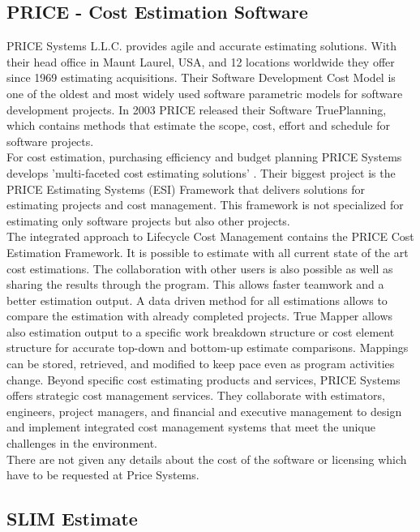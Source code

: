 \subsection{PRICE - Cost Estimation Software}

PRICE Systems L.L.C. provides agile and accurate estimating solutions. With their head office in Maunt Laurel, USA, and 12 locations worldwide they offer since 1969 estimating acquisitions. Their Software Development Cost Model is one of the oldest and most widely used software parametric models for software development projects. In 2003 PRICE released their Software TruePlanning, which contains methods that estimate the scope, cost, effort and schedule for software projects.
\\
For cost estimation, purchasing efficiency and budget planning PRICE Systems develops 'multi-faceted cost estimating solutions' \cite{pricesystems}. Their biggest project is the PRICE Estimating Systems (ESI) Framework that delivers solutions for estimating projects and cost management. This framework is not specialized for estimating only software projects but also other projects.
\\
The integrated approach to Lifecycle Cost Management contains the PRICE Cost Estimation Framework. It is possible to estimate with all current state of the art cost estimations. The collaboration with other users is also possible as well as sharing the results through the program. This allows faster teamwork and a better estimation output. A data driven method for all estimations allows to compare the estimation with already completed projects. True Mapper allows also estimation output to a specific work breakdown structure or cost element structure for accurate top-down and bottom-up estimate comparisons. Mappings can be stored, retrieved, and modified to keep pace even as program activities change. Beyond specific cost estimating products and services, PRICE Systems offers strategic cost management services. They collaborate with estimators, engineers, project managers, and financial and executive management to design and implement integrated cost management systems that meet the unique challenges in the environment.
\\
There are not given any details about the cost of the software or licensing which have to be requested at Price Systems.

\subsection{SLIM Estimate}

